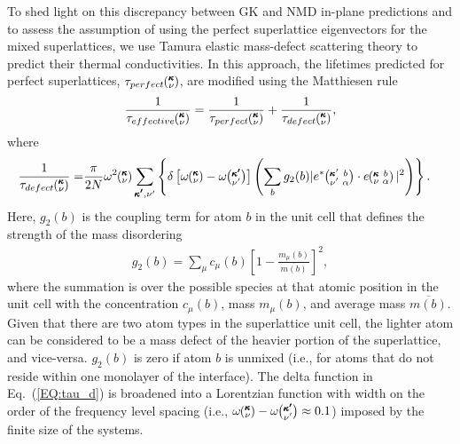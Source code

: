 \documentclass[aps,prb,preprint,preprintnumbers,amsmath,amssymb,floatfix,superscriptaddress]{revtex4}
\newcommand{\kvba}{\mspace{-4.0mu}\left(\mspace{-8.0mu}
\begin{smallmatrix} &\pmb{\kappa} &b \\ &\nu &\alpha\end{smallmatrix}
\mspace{-3.0mu}\right)}
\newcommand{\kvbap}{\mspace{-4.0mu}\left(\mspace{-8.0mu}
\begin{smallmatrix} &\pmb{\kappa}' &b \\ &\nu' &\alpha\end{smallmatrix}
\mspace{-3.0mu}\right)}
\newcommand{\kv}{\mspace{-4.0mu}\left(\mspace{-8.0mu}
\begin{smallmatrix}&\pmb{\kappa} \\&\nu\end{smallmatrix}
\mspace{-3.0mu}\right)}
\newcommand{\kvp}{\mspace{-4.0mu}\left(\mspace{-8.0mu}
\begin{smallmatrix}&\pmb{\kappa'} \\&\nu'\end{smallmatrix}
\mspace{-3.0mu}\right)}
\begin{document}
To shed light on this discrepancy between GK and NMD in-plane predictions and to assess the assumption of using the perfect superlattice eigenvectors for the mixed superlattices, we use Tamura elastic mass-defect scattering theory to predict their thermal conductivities. \cite{tamura_isotope_1983} In this approach, the lifetimes predicted for perfect superlattices, $\tau_{perfect}\kv$, are modified using the Matthiesen rule %
\begin{equation}\label{EQ:tau_eff}
\begin{split}
\frac{1}{\tau_{effective}\kv} = \frac{1}{\tau_{perfect}\kv} +\frac{1}{\tau_{defect}\kv},
\end{split}
\end{equation}
where
\begin{equation}\label{EQ:tau_d}
\begin{split}
\frac{1}{\tau_{defect}\kv} = &\frac{\pi}{2N}\omega^2\kv \sum_{\pmb{\kappa'},\nu'} \left\{ \delta\left[ \omega\kv - \omega\kvp \right]
\left (\sum_{b} g_2(b) |e^*\kvbap \cdot e\kvba |^2 \right )\right \} .
\end{split}
\end{equation}
Here, $g_2(b)$ is the coupling term for atom $b$ in the unit cell that defines the strength of the mass disordering
\begin{equation}\label{EQ:g(b)}
\begin{split}
g_2(b) = \sum_\mu c_{\mu}(b)\left[1-\frac{m_{\mu}(b)}{\overline{m(b)}}\right]^2, 
\end{split}
\end{equation}
where the summation is over the possible species at that atomic position in the unit cell with the concentration $c_\mu(b)$, mass $m_\mu(b)$, and average mass $\overline{m(b)}$. Given that there are two atom types in the superlattice unit cell, the lighter atom can be considered to be a mass defect of the heavier portion of the superlattice, and vice-versa. $g_2(b)$ is zero if atom $b$ is unmixed (i.e., for atoms that do not reside within one monolayer of the interface). The delta function in Eq.~(\ref{EQ:tau_d}) is broadened into a Lorentzian function with width on the order of the frequency level spacing (i.e., $\omega \kv -\omega \kvp \approx 0.1$) imposed by the finite size of the systems.\cite{allen_thermal_1993}
\end{document}

